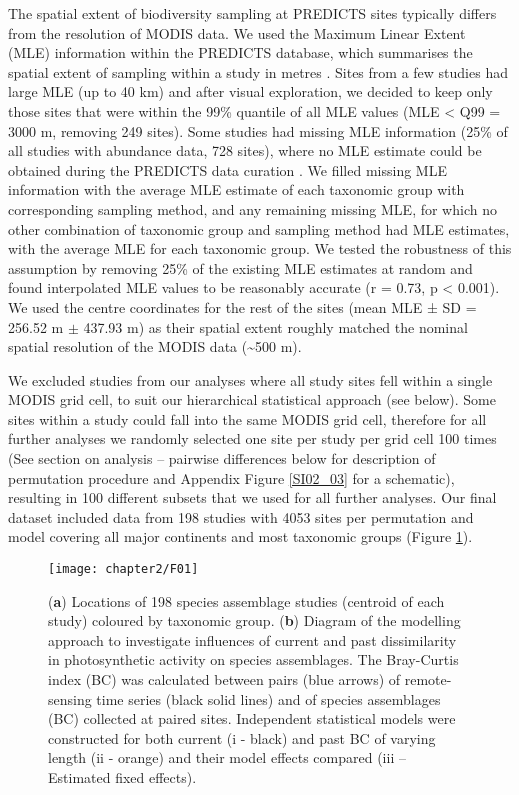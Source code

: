The spatial extent of biodiversity sampling at PREDICTS sites typically differs from the resolution of MODIS data. We used the Maximum Linear Extent (MLE) information within the PREDICTS database, which summarises the spatial extent of sampling within a study in metres \citep{Hudson2016}. Sites from a few studies had large MLE (up to 40 km) and after visual exploration, we decided to keep only those sites that were within the 99\% quantile of all MLE values (MLE < Q99 = 3000 m, removing 249 sites). Some studies had missing MLE information (25\% of all studies with abundance data, 728 sites), where no MLE estimate could be obtained during the PREDICTS data curation \citep{Hudson2016}. We filled missing MLE information with the average MLE estimate of each taxonomic group with corresponding sampling method, and any remaining missing MLE, for which no other combination of taxonomic group and sampling method had MLE estimates, with the average MLE for each taxonomic group. We tested the robustness of this assumption by removing 25\% of the existing MLE estimates at random and found interpolated MLE values to be reasonably accurate (r = 0.73, p < 0.001). We used the centre coordinates for the rest of the sites (mean MLE ± SD = 256.52 m $\pm$ 437.93 m) as their spatial extent roughly matched the nominal spatial resolution of the MODIS data (\textasciitilde 500 m). 

We excluded studies from our analyses where all study sites fell within a single MODIS grid cell, to suit our hierarchical statistical approach (see below). Some sites within a study could fall into the same MODIS grid cell, therefore for all further analyses we randomly selected one site per study per grid cell 100 times (See section on analysis – pairwise differences below for description of permutation procedure and Appendix Figure \ref{SI02_03} for a schematic), resulting in 100 different subsets that we used for all further analyses. Our final dataset included data from 198 studies with 4053 sites per permutation and model covering all major continents and most taxonomic groups (Figure \ref{F02_01}).

\begin{figure}[h]
\centering
\texttt{[image: chapter2/F01]}
\caption{ (\textbf{a}) Locations of 198 species assemblage studies (centroid of each study) coloured by taxonomic group. (\textbf{b}) Diagram of the modelling approach to investigate influences of current and past dissimilarity in photosynthetic activity on species assemblages. The Bray-Curtis index (BC) was calculated between pairs (blue arrows) of remote-sensing time series (black solid lines) and of species assemblages (BC) collected at paired sites. Independent statistical models were constructed for both current (i - black) and past BC of varying length (ii - orange) and their model effects compared (iii – Estimated fixed effects).}
\label{F02_01}
\end{figure}

